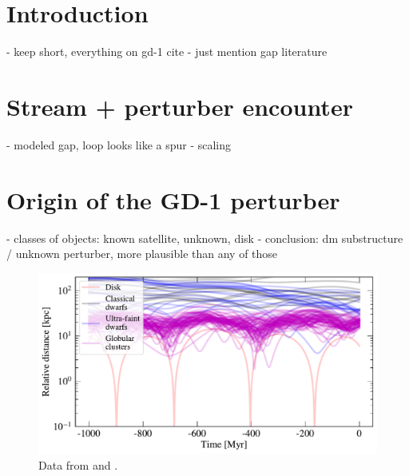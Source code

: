 \documentclass[12pt, modern]{aastex62h}
\begin{document}

\section{Introduction}
\label{sec:intro}
- keep short, everything on gd-1 cite
- just mention gap literature

\section{Stream + perturber encounter}
\label{sec:model}
- modeled gap, loop looks like a spur
- scaling

\section{Origin of the GD-1 perturber}
\label{sec:origin}
- classes of objects: known satellite, unknown, disk
- conclusion: dm substructure / unknown perturber, more plausible than any of those

\begin{figure}
\begin{center}
\includegraphics[width=\textwidth]{satellite_distances.pdf}
\end{center}
\caption{Data from \citet{simon2018} and \citet{gdr2_satellites}.}
\label{fig:known_encounters}
\end{figure}






\end{document}

